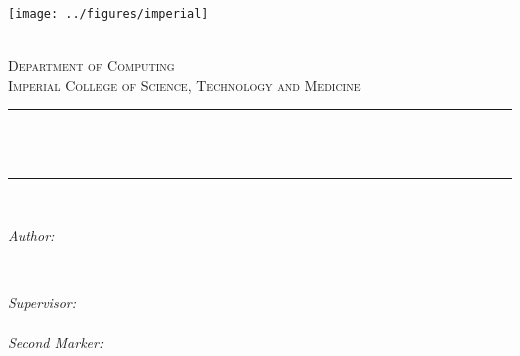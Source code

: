 \begin{titlepage}

    \newcommand{\HRule}{\rule{\linewidth}{0.5mm}} %
    
    
    \texttt{[image: ../figures/imperial]}\\[0.5cm] 
    
    \center %
     
    
    \textsc{\LARGE \reporttype}\\[1.5cm] 
    \textsc{\Large Department of Computing}\\[0.5cm] 
    \textsc{\large Imperial College of Science, Technology and Medicine}\\[0.5cm] 
    
    
    \HRule \\[0.4cm]
    { \huge \bfseries \reporttitle}\\ %
    \HRule \\[1.5cm]
     
    
    \begin{minipage}{0.4\textwidth}
    \begin{flushleft} \large
    \emph{Author:}\\
    \reportauthor %
    \end{flushleft}
    \end{minipage}
    ~
    \begin{minipage}{0.4\textwidth}
    \begin{flushright} \large
    \emph{Supervisor:} \\
    \supervisor \\ %
    \vspace{1em}
    \emph{Second Marker:} \\
    \secondMarker %
    \end{flushright}
    \end{minipage}\\[4cm]
    

\end{titlepage}
